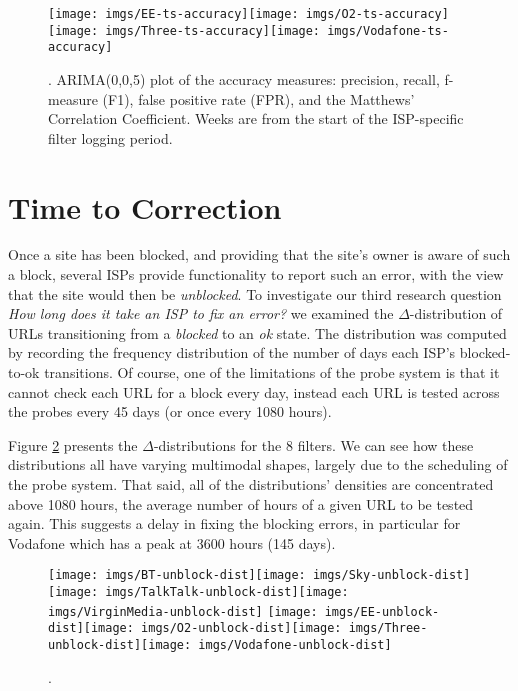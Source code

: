 \documentclass{bmcart}
\begin{document}
\begin{figure}[h!]
\caption{. ARIMA(0,0,5) plot of the accuracy measures: precision, recall, f-measure (F1), false positive rate (FPR), and the Matthews' Correlation Coefficient. Weeks are from the start of the ISP-specific filter logging period.}
\texttt{[image: imgs/EE-ts-accuracy]}\texttt{[image: imgs/O2-ts-accuracy]}
\texttt{[image: imgs/Three-ts-accuracy]}\texttt{[image: imgs/Vodafone-ts-accuracy]}
\label{fig:mobile-accuracy-ts}
\end{figure}
\clearpage






\section*{Time to Correction}
Once a site has been blocked, and providing that the site's owner is aware of such a block, several ISPs provide functionality to report such an error, with the view that the site would then be \textit{unblocked}.
To investigate our third research question \textit{How long does it take an ISP to fix an error?} we examined the $\Delta$-distribution of URLs transitioning from a \textit{blocked} to an \textit{ok} state.
The distribution was computed by recording the frequency distribution of the number of days each ISP's blocked-to-ok transitions.
Of course, one of the limitations of the probe system is that it cannot check each URL for a block every day, instead each URL is tested across the probes every 45 days (or once every 1080 hours).

Figure \ref{fig:isps-unblock-dist} presents the $\Delta$-distributions for the 8 filters.
We can see how these distributions all have varying multimodal shapes, largely due to the scheduling of the probe system.
That said, all of the distributions' densities are concentrated above 1080 hours, the average number of hours of a given URL to be tested again.
This suggests a delay in fixing the blocking errors, in particular for Vodafone which has a peak at 3600 hours (145 days).

\begin{figure}[h!]
\caption{.}
\texttt{[image: imgs/BT-unblock-dist]}\texttt{[image: imgs/Sky-unblock-dist]}\texttt{[image: imgs/TalkTalk-unblock-dist]}\texttt{[image: imgs/VirginMedia-unblock-dist]}
\texttt{[image: imgs/EE-unblock-dist]}\texttt{[image: imgs/O2-unblock-dist]}\texttt{[image: imgs/Three-unblock-dist]}\texttt{[image: imgs/Vodafone-unblock-dist]}
\label{fig:isps-unblock-dist}
\end{figure}
\end{document}
